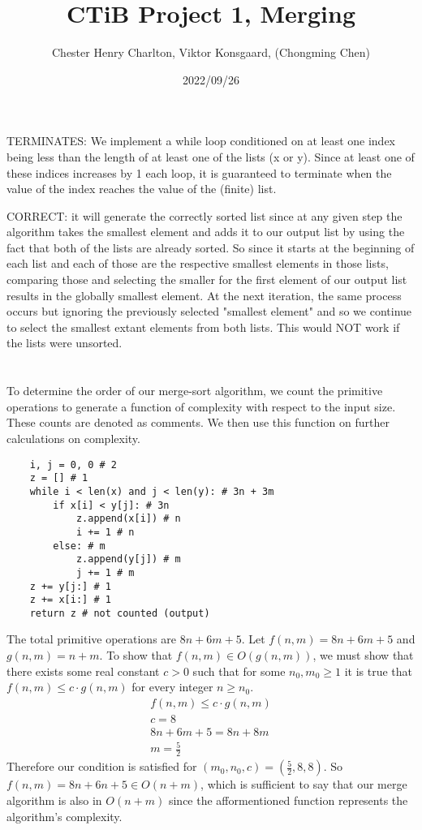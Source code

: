 \documentclass{article}
\title{CTiB Project 1, Merging}
\author{Chester Henry Charlton, Viktor Konsgaard, (Chongming Chen)}
\date{2022/09/26}
\begin{document}
\maketitle

\section{}

    TERMINATES: We implement a while loop conditioned on at least one
    index being less than the length of at least one of the lists (x or y). 
    Since at least one of these indices increases by 1 each loop, it is guaranteed
    to terminate when the value of the index reaches the value of the (finite) list. 

    CORRECT: it will generate the correctly sorted list since at any given step
    the algorithm takes the smallest element and adds it to our output list by 
    using the fact that both of the lists are already sorted. So since it starts
    at the beginning of each list and each of those are the respective smallest 
    elements in those lists, comparing those and selecting the smaller for the first 
    element of our output list results in the globally smallest element. At the next 
    iteration, the same process occurs but ignoring the previously selected "smallest 
    element" and so we continue to select the smallest extant elements from both lists. This would NOT work if the lists were unsorted.
\section{}
To determine the order of our merge-sort algorithm, we count the primitive operations 
to generate a function of complexity with respect to the input size. These counts
are denoted as comments. We then use this function on further calculations on complexity. 
\begin{lstlisting}
    i, j = 0, 0 # 2
    z = [] # 1
    while i < len(x) and j < len(y): # 3n + 3m
        if x[i] < y[j]: # 3n
            z.append(x[i]) # n
            i += 1 # n
        else: # m
            z.append(y[j]) # m
            j += 1 # m
    z += y[j:] # 1
    z += x[i:] # 1
    return z # not counted (output)
\end{lstlisting}
The total primitive operations are  $8n + 6m + 5$. Let $f(n,m) = 8n + 6m + 5$ and 
$g(n,m) = n + m$. To show that $f(n,m) \in O(g(n,m))$, we must show that there exists 
some real constant $c > 0$ such that for some $n_0,m_0 \geq 1$ it is true that 
$f(n,m) \leq c \cdot g(n,m)$ for every integer $n \geq n_0$. 
\begin{align*}
    f(n,m) \leq c \cdot g(n,m) \\
    c = 8 \\
    8n + 6m + 5 = 8n + 8m \\
    m = \frac 5 2 
\end{align*}
Therefore our condition is satisfied for $(m_0, n_0, c) = (\frac 5 2, 8, 8)$.
So $f(n,m) = 8n + 6n + 5 \in O(n +m)$, which is sufficient to say that our merge 
algorithm is also in $O(n+m)$ since the afformentioned function represents the 
algorithm's complexity. 
\end{document}
